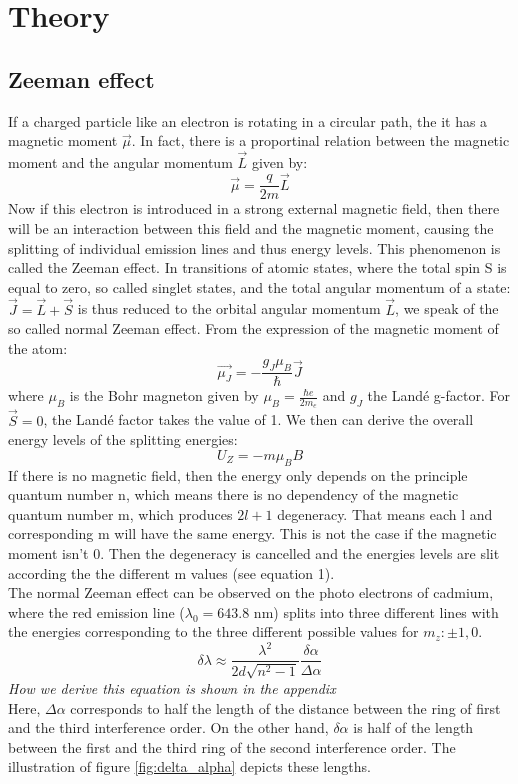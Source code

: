 \documentclass{scrartcl}
\begin{document}
\section{Theory}
\subsection{Zeeman effect}
If a charged particle like an electron is rotating in a circular path, the it has a magnetic moment $\Vec{\mu}$. In fact, there is a proportinal relation between the magnetic moment and the angular momentum $\Vec{L}$ given by:
\[ \Vec{\mu} = \frac{q}{2m}\Vec{L} \]
Now if this electron is introduced in a strong external magnetic field, then there will be an interaction between this field and the magnetic moment, causing the splitting of individual emission lines and thus energy levels.
This phenomenon is called the Zeeman effect. In transitions of atomic states, where the total spin S is equal to zero, so called singlet states, and the total angular momentum of a state: $\Vec{J}=\Vec{L}+\Vec{S}$ is thus reduced to the orbital angular momentum $\Vec{L}$, we speak of the so called normal Zeeman effect. From the expression of the magnetic moment of the atom:
\[\Vec{\mu_J}=-\frac{g_J\mu_B}{\hbar}\Vec{J}\]
where $\mu_B$ is the Bohr magneton given by $\mu_B=\frac{\hbar e}{2m_e}$ and $g_J$ the Landé g-factor. For $\Vec{S} = 0$, the Landé factor takes the value of 1. We then can derive the overall energy levels of the splitting energies:
\begin{equation}
    U_Z = - m \mu_B B
\end{equation}
If there is no magnetic field, then the energy only depends on the principle quantum number n, which means there is no dependency of the magnetic quantum number m, which produces $2l +1$ degeneracy. That means each l and corresponding m will have the same energy. This is not the case if the magnetic moment isn't 0. Then the degeneracy is cancelled and the energies levels are slit according the the different m values (see equation 1).\\
The normal Zeeman effect can be observed on the photo electrons of cadmium, where the red emission line ($\lambda_0=643.8 $ nm) splits into three different lines with the energies corresponding to the three different possible values for $m_z: \pm1, 0$.
\begin{equation}
    \delta \lambda \approx \frac{\lambda^2}{2d\sqrt{n^2-1}}\frac{\delta \alpha}{\Delta \alpha}
    \label{equation_delta_lambda}
\end{equation}
\textit{How we derive this equation is shown in the appendix}\\ 
Here, $\Delta \alpha$ corresponds to half the length of the distance between the ring of first and the third interference order. On the other hand, $\delta \alpha$ is half of the length between the first and the third ring of the second interference order. The illustration of figure \ref{fig:delta_alpha} depicts these lengths.
\end{document}
